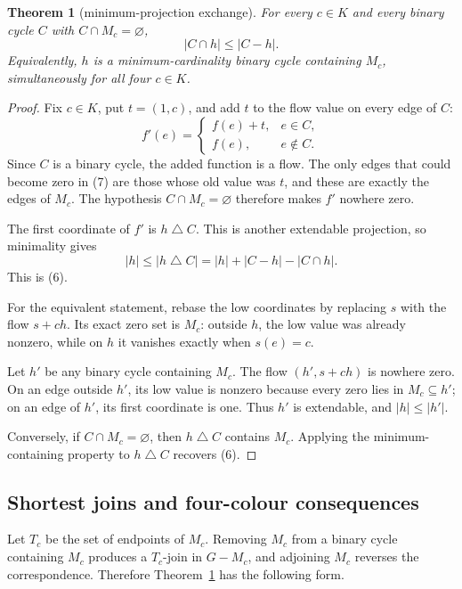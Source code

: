 \documentclass[11pt]{article}
\newtheorem{theorem}{Theorem}[section]
\theoremstyle{definition}
\theoremstyle{remark}
\newcommand{\symdiff}{\mathbin{\triangle}}
\begin{document}
\begin{theorem}[minimum-projection exchange]\label{thm:exchange}
For every \(c\in K\) and every binary cycle \(C\) with
\(C\cap M_c=\varnothing\),
\[
                         |C\cap h|\le |C-h|.                    \tag{6}
\]
Equivalently, \(h\) is a minimum-cardinality binary cycle containing
\(M_c\), simultaneously for all four \(c\in K\).
\end{theorem}

\begin{proof}
Fix \(c\in K\), put \(t=(1,c)\), and add \(t\) to the flow value on every
edge of \(C\):
\[
 f'(e)=
 \begin{cases}
   f(e)+t,&e\in C,\\
   f(e),&e\notin C.
 \end{cases}                                                   \tag{7}
\]
Since \(C\) is a binary cycle, the added function is a flow.  The only
edges that could become zero in (7) are those whose old value was \(t\),
and these are exactly the edges of \(M_c\).  The hypothesis
\(C\cap M_c=\varnothing\) therefore makes \(f'\) nowhere zero.

The first coordinate of \(f'\) is \(h\symdiff C\).  This is another
extendable projection, so minimality gives
\[
 |h|\le |h\symdiff C|
     =|h|+|C-h|-|C\cap h|.
\]
This is (6).

For the equivalent statement, rebase the low coordinates by replacing
\(s\) with the flow \(s+ch\).  Its exact zero set is \(M_c\): outside
\(h\), the low value was already nonzero, while on \(h\) it vanishes
exactly when \(s(e)=c\).

Let \(h'\) be any binary cycle containing \(M_c\).  The flow
\((h',s+ch)\) is nowhere zero.  On an edge outside \(h'\), its low value is
nonzero because every zero lies in \(M_c\subseteq h'\); on an edge of
\(h'\), its first coordinate is one.  Thus \(h'\) is extendable, and
\(|h|\le |h'|\).

Conversely, if \(C\cap M_c=\varnothing\), then
\(h\symdiff C\) contains \(M_c\).  Applying the minimum-containing
property to \(h\symdiff C\) recovers (6).
\end{proof}

\subsection{Shortest joins and four-colour consequences}

Let \(T_c\) be the set of endpoints of \(M_c\).  Removing \(M_c\) from a
binary cycle containing \(M_c\) produces a \(T_c\)-join in \(G-M_c\), and
adjoining \(M_c\) reverses the correspondence.  Therefore
Theorem~\ref{thm:exchange} has the following form.
\end{document}
